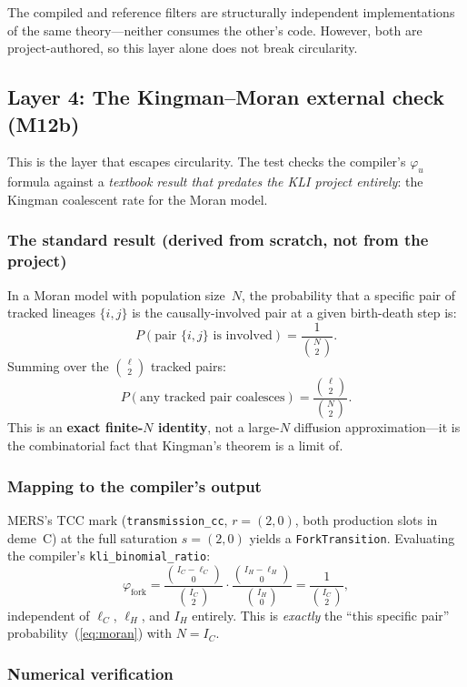 \documentclass[11pt,leqno]{article}
\newcommand{\code}[1]{\texttt{#1}}
\theoremstyle{plain}
\theoremstyle{definition}
\begin{document}
The compiled and reference filters are structurally independent
implementations of the same theory---neither consumes the other's code.
However, both are project-authored, so this layer alone does not break
circularity.

\subsection{Layer 4: The Kingman--Moran external check (M12b)}

This is the layer that escapes circularity.  The test checks the
compiler's $\varphi_u$ formula against a \emph{textbook result that
predates the KLI project entirely}: the Kingman coalescent rate for the
Moran model.

\subsubsection{The standard result (derived from scratch, not from the
project)}

In a Moran model with population size~$N$, the probability that a
specific pair of tracked lineages $\{i,j\}$ is the causally-involved
pair at a given birth-death step is:
\begin{equation}\label{eq:moran}
  P(\text{pair } \{i,j\} \text{ is involved}) = \frac{1}{\binom{N}{2}}.
\end{equation}
Summing over the $\binom{\ell}{2}$ tracked pairs:
\[
  P(\text{any tracked pair coalesces}) = \frac{\binom{\ell}{2}}{\binom{N}{2}}.
\]
This is an \textbf{exact finite-$N$ identity}, not a large-$N$
diffusion approximation---it is the combinatorial fact that Kingman's
theorem is a limit of.

\subsubsection{Mapping to the compiler's output}

MERS's TCC mark (\code{transmission\_cc}, $r = (2,0)$, both production
slots in deme~C) at the full saturation $s = (2,0)$ yields a
\code{ForkTransition}.  Evaluating the compiler's
\code{kli\_binomial\_ratio}:
\[
  \varphi_{\text{fork}} =
  \frac{\binom{I_C - \ell_C}{0}}{\binom{I_C}{2}}
  \cdot \frac{\binom{I_H - \ell_H}{0}}{\binom{I_H}{0}}
  = \frac{1}{\binom{I_C}{2}},
\]
independent of $\ell_C$, $\ell_H$, and $I_H$ entirely.  This is
\emph{exactly} the ``this specific pair'' probability~(\ref{eq:moran})
with $N = I_C$.

\subsubsection{Numerical verification}
\end{document}
